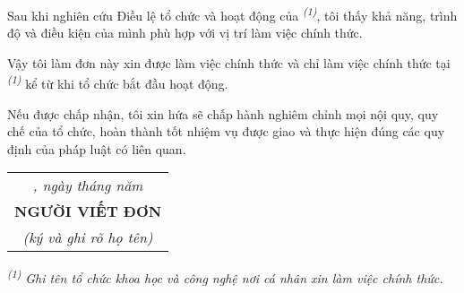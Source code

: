 \documentclass[11pt, letterpaper, oneside]{article}
\begin{document}
\noindent
Sau khi nghiên cứu Điều lệ tổ chức và hoạt động của \hspace{1cm} \textsuperscript{\textit{(1)}}, tôi thấy khả năng, trình độ và điều kiện của mình phù hợp với vị trí làm việc chính thức.
\vspace{8pt}

\noindent
Vậy tôi làm đơn này xin được làm việc chính thức và chỉ làm việc chính thức tại \hspace{1cm} \textsuperscript{\textit{(1)}} kể từ khi tổ chức bắt đầu hoạt động.
\vspace{8pt}

\noindent
Nếu được chấp nhận, tôi xin hứa sẽ chấp hành nghiêm chỉnh mọi nội quy, quy chế của tổ chức, hoàn thành tốt nhiệm vụ được giao và thực hiện đúng các quy định của pháp luật có liên quan.

\renewcommand{\arraystretch}{1.08}
\begin{flushright}
    \begin{tabular}{c}
        \textit{\hspace{1cm}, ngày \hspace{0.5cm} tháng \hspace{0.5cm} năm} \\
        \textbf{NGƯỜI VIẾT ĐƠN} \\
        \textit{(ký và ghi rõ họ tên)}
    \end{tabular}
\end{flushright}

\newpage
\noindent
\textsuperscript{\textit{(1)}}
\textit{Ghi tên tổ chức khoa học và công nghệ nơi cá nhân xin làm việc chính thức.}
\end{document}
